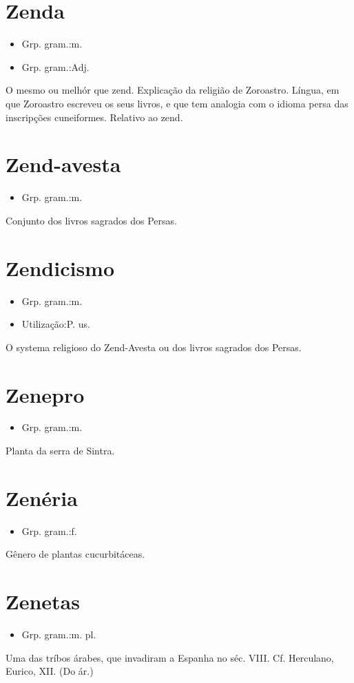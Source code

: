 \section{Zenda}
\begin{itemize}
\item {Grp. gram.:m.}
\end{itemize}
\begin{itemize}
\item {Grp. gram.:Adj.}
\end{itemize}
O mesmo ou melhór que \textunderscore zend\textunderscore .
Explicação da religião de Zoroastro.
Língua, em que Zoroastro escreveu os seus livros, e que tem analogia com o idioma persa das inscripções cuneiformes.
Relativo ao zend.
\section{Zend-avesta}
\begin{itemize}
\item {Grp. gram.:m.}
\end{itemize}
Conjunto dos livros sagrados dos Persas.
\section{Zendicismo}
\begin{itemize}
\item {Grp. gram.:m.}
\end{itemize}
\begin{itemize}
\item {Utilização:P. us.}
\end{itemize}
O systema religioso do Zend-Avesta ou dos livros sagrados dos Persas.
\section{Zenepro}
\begin{itemize}
\item {Grp. gram.:m.}
\end{itemize}
Planta da serra de Sintra.
\section{Zenéria}
\begin{itemize}
\item {Grp. gram.:f.}
\end{itemize}
Gênero de plantas cucurbitáceas.
\section{Zenetas}
\begin{itemize}
\item {Grp. gram.:m. pl.}
\end{itemize}
Uma das tríbos árabes, que invadiram a Espanha no séc. VIII. Cf. Herculano, \textunderscore Eurico\textunderscore , XII.
(Do ár.)
